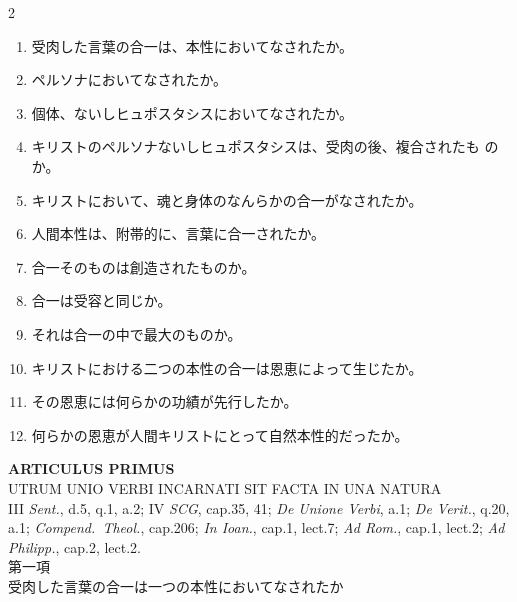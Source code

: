 \documentclass[paper=a4paper,fontsize=10pt,jafontsize=9pt,titlepage]{jlreq}
\begin{document}
\begin{paracol}{2}
\begin{enumerate}
 \item 受肉した言葉の合一は、本性においてなされたか。
 \item ペルソナにおいてなされたか。
 \item 個体、ないしヒュポスタシスにおいてなされたか。
 \item キリストのペルソナないしヒュポスタシスは、受肉の後、複合されたも
       のか。
 \item キリストにおいて、魂と身体のなんらかの合一がなされたか。
 \item 人間本性は、附帯的に、言葉に合一されたか。
 \item 合一そのものは創造されたものか。
 \item 合一は受容と同じか。
 \item それは合一の中で最大のものか。
 \item キリストにおける二つの本性の合一は恩恵によって生じたか。
 \item その恩恵には何らかの功績が先行したか。
 \item 何らかの恩恵が人間キリストにとって自然本性的だったか。
\end{enumerate}

\end{paracol}
\newpage


{}
\setcounter{section}{1}
\setcounter{subsection}{0}
\begin{center}
 {\Large {\bfseries ARTICULUS PRIMUS}}\\
 {\large UTRUM UNIO VERBI INCARNATI SIT FACTA IN UNA NATURA}\\
 {\footnotesize III {\itshape Sent.}, d.5, q.1, a.2; IV {\itshape SCG},
 cap.35, 41; {\itshape De Unione Verbi}, a.1; {\itshape De Verit.},
 q.20, a.1; {\itshape Compend.~Theol.}, cap.206; {\itshape In Ioan.},
 cap.1, lect.7; {\itshape Ad Rom.}, cap.1, lect.2; {\itshape Ad
 Philipp.}, cap.2, lect.2.}\\
 {\Large 第一項\\受肉した言葉の合一は一つの本性においてなされたか}
\end{center}
\end{document}
